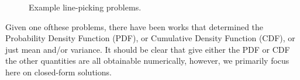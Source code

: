 \documentclass{article}
\begin{document}
\begin{figure}[tbp]
  \begin{center}
    \caption{Example line-picking problems.\label{fig:eg}}
  \end{center} 
\vspace{-4mm}
\end{figure}

Given one ofthese problems, there have been works that determined the
Probability Density Function (PDF), or Cumulative Density Function
(CDF), or just mean and/or variance. It should be clear that give
either the PDF or CDF the other quantities are all obtainable
numerically, however, we primarily focus here on closed-form
solutions. 
\end{document}

